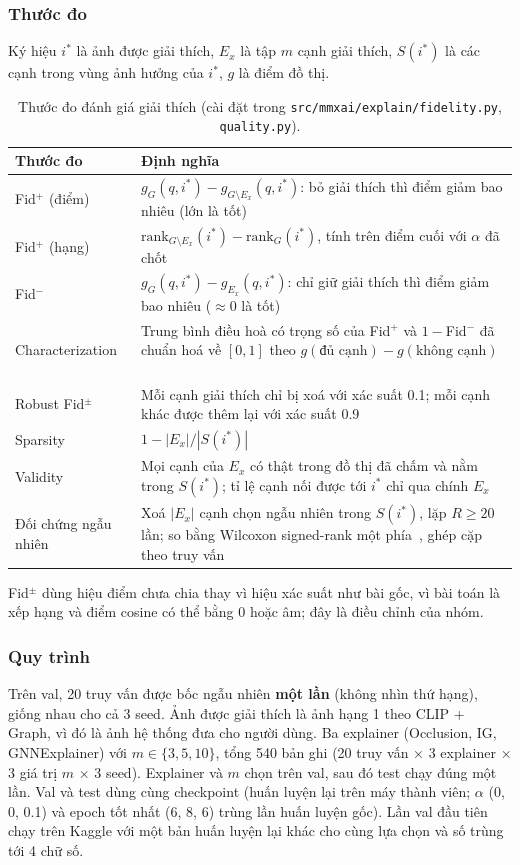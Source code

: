 \documentclass[12pt, a4paper]{article}
\newcommand{\code}[1]{\texttt{#1}}
\begin{document}
\subsubsection{Thước đo}
Ký hiệu $i^*$ là ảnh được giải thích, $E_x$ là tập $m$ cạnh giải thích, $S(i^*)$ là các cạnh trong vùng ảnh hưởng của $i^*$, $g$ là điểm đồ thị.
\begin{table}[H]
\centering\small
\caption{Thước đo đánh giá giải thích (cài đặt trong \code{src/mmxai/explain/fidelity.py}, \code{quality.py}).}
\label{tab:metrics}
\begin{tabularx}{\linewidth}{l X}
\toprule
\textbf{Thước đo} & \textbf{Định nghĩa} \\
\midrule
Fid$^+$ (điểm) & $g_G(q,i^*) - g_{G\setminus E_x}(q,i^*)$: bỏ giải thích thì điểm giảm bao nhiêu (lớn là tốt) \\
Fid$^+$ (hạng) & $\text{rank}_{G\setminus E_x}(i^*) - \text{rank}_G(i^*)$, tính trên điểm cuối với $\alpha$ đã chốt \\
Fid$^-$ & $g_G(q,i^*) - g_{E_x}(q,i^*)$: chỉ giữ giải thích thì điểm giảm bao nhiêu ($\approx 0$ là tốt) \\
Characterization & Trung bình điều hoà có trọng số của Fid$^+$ và $1-$Fid$^-$ đã chuẩn hoá về $[0,1]$ theo $g(\text{đủ cạnh}) - g(\text{không cạnh})$~\cite{amara2022graphframex} \\
Robust Fid$^\pm$ & Mỗi cạnh giải thích chỉ bị xoá với xác suất 0.1; mỗi cạnh khác được thêm lại với xác suất 0.9~\cite{zheng2024robust} \\
Sparsity & $1 - |E_x| / |S(i^*)|$ \\
Validity & Mọi cạnh của $E_x$ có thật trong đồ thị đã chấm và nằm trong $S(i^*)$; tỉ lệ cạnh nối được tới $i^*$ chỉ qua chính $E_x$ \\
Đối chứng ngẫu nhiên & Xoá $|E_x|$ cạnh chọn ngẫu nhiên trong $S(i^*)$, lặp $R\ge 20$ lần; so bằng Wilcoxon signed-rank một phía~\cite{wilcoxon1945}, ghép cặp theo truy vấn \\
\bottomrule
\end{tabularx}
\end{table}
Fid$^\pm$ dùng hiệu điểm chưa chia thay vì hiệu xác suất như bài gốc, vì bài toán là xếp hạng và điểm cosine có thể bằng 0 hoặc âm; đây là điều chỉnh của nhóm.

\subsubsection{Quy trình}
Trên val, 20 truy vấn được bốc ngẫu nhiên \textbf{một lần} (không nhìn thứ hạng), giống nhau cho cả 3 seed. Ảnh được giải thích là ảnh hạng 1 theo CLIP + Graph, vì đó là ảnh hệ thống đưa cho người dùng. Ba explainer (Occlusion, IG, GNNExplainer) với $m\in\{3,5,10\}$, tổng 540 bản ghi (20 truy vấn × 3 explainer × 3 giá trị $m$ × 3 seed). Explainer và $m$ chọn trên val, sau đó test chạy đúng một lần. Val và test dùng cùng checkpoint (huấn luyện lại trên máy thành viên; $\alpha$ (0, 0, 0.1) và epoch tốt nhất (6, 8, 6) trùng lần huấn luyện gốc). Lần val đầu tiên chạy trên Kaggle với một bản huấn luyện lại khác cho cùng lựa chọn và số trùng tới 4 chữ số.
\end{document}
